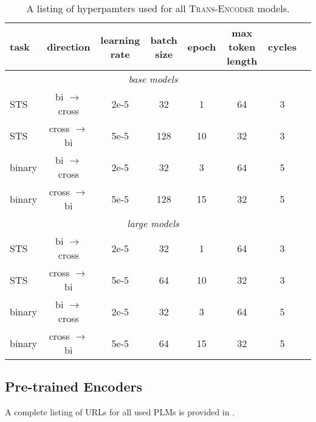\documentclass{article} \usepackage{iclr2021_conference,times}
\newcommand{\modelname}{\textsc{Trans-Encoder}\xspace}
\begin{document}
\begin{table*}[h] \small
\centering
\begin{tabular}{lccccccc}
\toprule
 task & direction & learning rate &  batch size & epoch & max token length & cycles \\
\midrule
\multicolumn{7}{c}{\textit{base models}} \\
\midrule
STS & bi $\rightarrow$ cross & 2e-5 & 32 & 1 & 64 & 3\\
STS & cross $\rightarrow$ bi & 5e-5 & 128 & 10 & 32 & 3\\
binary & bi $\rightarrow$ cross & 2e-5 & 32 & 3 & 64 & 5\\
binary & cross $\rightarrow$ bi & 5e-5 & 128 & 15 & 32 & 5 \\
\midrule
\multicolumn{7}{c}{\textit{large models}}  \\
\midrule
STS & bi $\rightarrow$ cross & 2e-5 & 32 & 1 & 64 & 3 \\
STS & cross $\rightarrow$ bi & 5e-5 & 64 & 10 & 32 & 3 \\
binary & bi $\rightarrow$ cross & 2e-5 & 32 & 3 & 64& 5 \\
binary & cross $\rightarrow$ bi & 5e-5 & 64 & 15 & 32 & 5 \\
\bottomrule
\end{tabular}
\caption{A listing of hyperpamters used for all \modelname models.}
\label{tab:hparams}
\end{table*}




\subsection{Pre-trained Encoders}\label{sec:appendix_huggingface_urls}
A complete listing of URLs for all used PLMs is provided in . 
\end{document}
